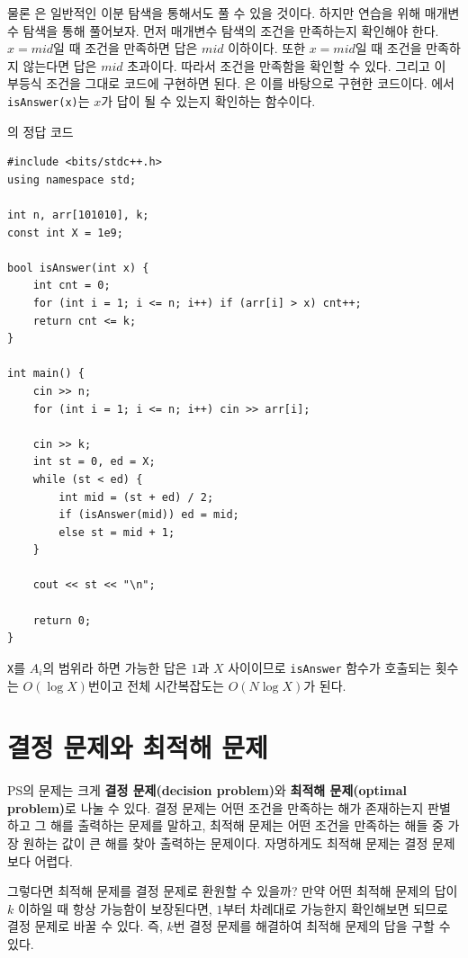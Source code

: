 물론 은 일반적인 이분 탐색을 통해서도 풀 수 있을 것이다. 하지만 연습을 위해 매개변수 탐색을 통해 풀어보자. 먼저 매개변수 탐색의 조건을 만족하는지 확인해야 한다. $x=mid$일 때 조건을 만족하면 답은 $mid$ 이하이다. 또한 $x=mid$일 때 조건을 만족하지 않는다면 답은 $mid$ 초과이다. 따라서 조건을 만족함을 확인할 수 있다. 그리고 이 부등식 조건을 그대로 코드에 구현하면 된다. 은 이를 바탕으로 구현한 코드이다. 에서 \texttt{isAnswer(x)}는 $x$가 답이 될 수 있는지 확인하는 함수이다.

\begin{code} \label{code: parametric-search}
의 정답 코드
\begin{lstlisting}
#include <bits/stdc++.h>
using namespace std;

int n, arr[101010], k;
const int X = 1e9;

bool isAnswer(int x) {
    int cnt = 0;
    for (int i = 1; i <= n; i++) if (arr[i] > x) cnt++;
    return cnt <= k;
}

int main() {
    cin >> n;
    for (int i = 1; i <= n; i++) cin >> arr[i];

    cin >> k;
    int st = 0, ed = X;
    while (st < ed) {
        int mid = (st + ed) / 2;
        if (isAnswer(mid)) ed = mid;
        else st = mid + 1;
    }

    cout << st << "\n";

    return 0;
}
\end{lstlisting}
\end{code}

\texttt{X}를 $A_i$의 범위라 하면 가능한 답은 $1$과 $X$ 사이이므로 \texttt{isAnswer} 함수가 호출되는 횟수는 $O(\log X)$번이고 전체 시간복잡도는 $O(N \log X)$가 된다.

\section{결정 문제와 최적해 문제}
PS의 문제는 크게 \textbf{결정 문제(decision problem)}와 \textbf{최적해 문제(optimal problem)}로 나눌 수 있다. 결정 문제는 어떤 조건을 만족하는 해가 존재하는지 판별하고 그 해를 출력하는 문제를 말하고, 최적해 문제는 어떤 조건을 만족하는 해들 중 가장 원하는 값이 큰 해를 찾아 출력하는 문제이다. 자명하게도 최적해 문제는 결정 문제보다 어렵다.

그렇다면 최적해 문제를 결정 문제로 환원할 수 있을까? 만약 어떤 최적해 문제의 답이 $k$ 이하일 때 항상 가능함이 보장된다면, $1$부터 차례대로 가능한지 확인해보면 되므로 결정 문제로 바꿀 수 있다. 즉, $k$번 결정 문제를 해결하여 최적해 문제의 답을 구할 수 있다.

